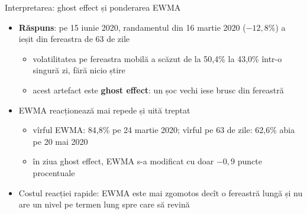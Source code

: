 \begin{frame}{Interpretarea: ghost effect și ponderarea EWMA}
\itemsize{\small}
\begin{itemize}
    \item \textbf{Răspuns}: pe 15 iunie 2020, randamentul din 16 martie 2020 ($-12{,}8\%$) a ieșit din fereastra de 63 de zile
    \begin{itemize}
        \item volatilitatea pe fereastra mobilă a scăzut de la 50{,}4\% la 43{,}0\% într-o singură zi, fără nicio știre
        \item acest artefact este \textbf{ghost effect}: un șoc vechi iese brusc din fereastră
    \end{itemize}
    \item EWMA reacționează mai repede și uită treptat
    \begin{itemize}
        \item vîrful EWMA: 84{,}8\% pe 24 martie 2020; vîrful pe 63 de zile: 62{,}6\% abia pe 20 mai 2020
        \item în ziua ghost effect, EWMA s-a modificat cu doar $-0{,}9$ puncte procentuale
    \end{itemize}
    \item Costul reacției rapide: EWMA este mai zgomotos decît o fereastră lungă și nu are un nivel pe termen lung spre care să revină
\end{itemize}
\end{frame}

